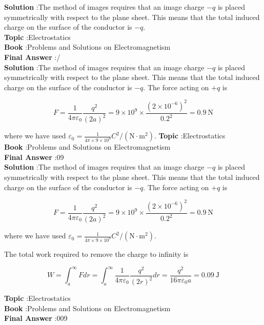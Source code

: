 \documentclass[10pt]{article}
\begin{document}
\textbf{Solution} :The method of images requires that an image charge $-q$ is placed symmetrically with respect to the plane sheet. This means that the total induced charge on the surface of the conductor is $-q$.
\\
\textbf{Topic} :Electrostatics\\
\textbf{Book} :Problems and Solutions on Electromagnetism\\
\textbf{Final Answer} :\pi / \ln {}\\


\textbf{Solution} :The method of images requires that an image charge $-q$ is placed symmetrically with respect to the plane sheet. This means that the total induced charge on the surface of the conductor is $-q$.
 The force acting on $+q$ is

$$
F=\frac{1}{4 \pi \varepsilon_{0}} \frac{q^{2}}{(2 a)^{2}}=9 \times 10^{9} \times \frac{\left(2 \times 10^{-6}\right)^{2}}{0.2^{2}}=0.9 \mathrm{~N}
$$

where we have used $\varepsilon_{0}=\frac{1}{4 \pi \times 9 \times 10^{9}} C^{2} /\left(\mathrm{N} \cdot \mathrm{m}^{2}\right)$.
\textbf{Topic} :Electrostatics\\
\textbf{Book} :Problems and Solutions on Electromagnetism\\
\textbf{Final Answer} :09 \\


\textbf{Solution} :The method of images requires that an image charge $-q$ is placed symmetrically with respect to the plane sheet. This means that the total induced charge on the surface of the conductor is $-q$.
 The force acting on $+q$ is

$$
F=\frac{1}{4 \pi \varepsilon_{0}} \frac{q^{2}}{(2 a)^{2}}=9 \times 10^{9} \times \frac{\left(2 \times 10^{-6}\right)^{2}}{0.2^{2}}=0.9 \mathrm{~N}
$$

where we have used $\varepsilon_{0}=\frac{1}{4 \pi \times 9 \times 10^{9}} C^{2} /\left(\mathrm{N} \cdot \mathrm{m}^{2}\right)$.

 The total work required to remove the charge to infinity is

$$
W=\int_{a}^{\infty} F d r=\int_{a}^{\infty} \frac{1}{4 \pi \varepsilon_{0}} \frac{q^{2}}{(2 r)^{2}} d r=\frac{q^{2}}{16 \pi \varepsilon_{0} a}=0.09 \mathrm{~J}
$$

\textbf{Topic} :Electrostatics\\
\textbf{Book} :Problems and Solutions on Electromagnetism\\
\textbf{Final Answer} :009 \\
\end{document}
